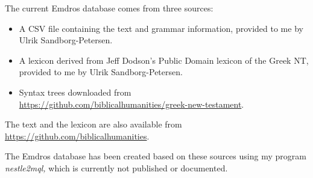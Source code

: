 \documentclass[11pt,oneside,a4paper]{memoir}
\begin{document}
The current Emdros database comes from three sources:

\begin{itemize}
\item A CSV file containing the text and grammar information, provided to me by Ulrik
  Sandborg-Petersen.
\item A lexicon derived from Jeff Dodson's Public Domain lexicon of the Greek NT, provided to me by
  Ulrik Sandborg-Petersen.
\item Syntax trees downloaded from\\
  \url{https://github.com/biblicalhumanities/greek-new-testament}.
\end{itemize}

The text and the lexicon are also available from \url{https://github.com/biblicalhumanities}.

The Emdros database has been created based on these sources using my program
\emph{nestle2mql,} which is currently not published or documented.

\printindex
\end{document}
